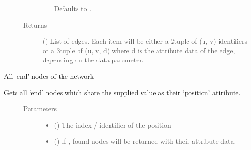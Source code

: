 \documentclass[letterpaper,10pt,english]{sphinxmanual}
\begin{document}
\begin{fulllineitems}
\begin{fulllineitems}
\begin{quote}
\begin{description}
\begin{itemize}
Defaults to .


\end{itemize}

\item[{Returns}] \leavevmode
{} () \textendash{} List of edges. Each item will be either a 2\sphinxhyphen{}tuple of (u, v)
identifiers or a 3\sphinxhyphen{}tuple of (u, v, d) where d is the attribute data
of the edge, depending on the data parameter.

\end{description}\end{quote}

\end{fulllineitems}


\begin{fulllineitems}
\label{\detokenize{cockatoo:cockatoo.KnitNetworkBase.end_nodes}}
All ‘end’ nodes of the network

\end{fulllineitems}


\begin{fulllineitems}
\label{\detokenize{cockatoo:cockatoo.KnitNetworkBase.ends_on_position}}
Gets all ‘end’ nodes which share the supplied value as their ‘position’
attribute.
\begin{quote}\begin{description}
\item[{Parameters}] \leavevmode\begin{itemize}
\item {} 
 () \textendash{} The index / identifier of the position

\item {} 
 (\sphinxstyleliteralemphasis{\sphinxupquote{, }}) \textendash{} 
If , found nodes will be returned with their attribute data.


\end{itemize}
\end{description}
\end{quote}
\end{fulllineitems}
\end{fulllineitems}
\end{document}
